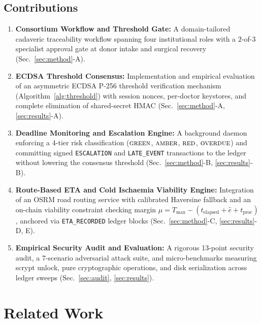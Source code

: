 \documentclass[journal]{IEEEtran}
\begin{document}
\subsection*{Contributions}
\begin{enumerate}
  \item \textbf{Consortium Workflow and Threshold Gate:} A domain-tailored cadaveric
        traceability workflow spanning four institutional roles with a $2$-of-$3$
        specialist approval gate at donor intake and surgical recovery (Sec.~\ref{sec:method}-A).
  \item \textbf{ECDSA Threshold Consensus:} Implementation and empirical evaluation
        of an asymmetric ECDSA P-256 threshold verification mechanism (Algorithm~\ref{alg:threshold})
        with session nonces, per-doctor keystores, and complete elimination of shared-secret HMAC (Sec.~\ref{sec:method}-A, \ref{sec:results}-A).
  \item \textbf{Deadline Monitoring and Escalation Engine:} A background daemon
        enforcing a 4-tier risk classification ($\textsc{green}$, $\textsc{amber}$, $\textsc{red}$, $\textsc{overdue}$)
        and committing signed \texttt{ESCALATION} and \texttt{LATE\_EVENT} transactions to the ledger without
        lowering the consensus threshold (Sec.~\ref{sec:method}-B, \ref{sec:results}-B).
  \item \textbf{Route-Based ETA and Cold Ischaemia Viability Engine:} Integration of
        an OSRM road routing service with calibrated Haversine fallback and an on-chain
        viability constraint checking margin $\mu = T_{\max} - (t_{\text{elapsed}} + \hat{e} + t_{\text{proc}})$,
        anchored via \texttt{ETA\_RECORDED} ledger blocks (Sec.~\ref{sec:method}-C, \ref{sec:results}-D, E).
  \item \textbf{Empirical Security Audit and Evaluation:} A rigorous 13-point security
        audit, a 7-scenario adversarial attack suite, and micro-benchmarks measuring
        scrypt unlock, pure cryptographic operations, and disk serialization across ledger sweeps
        (Sec.~\ref{sec:audit}, \ref{sec:results}).
\end{enumerate}

\section{Related Work}\label{sec:related}
\end{document}
